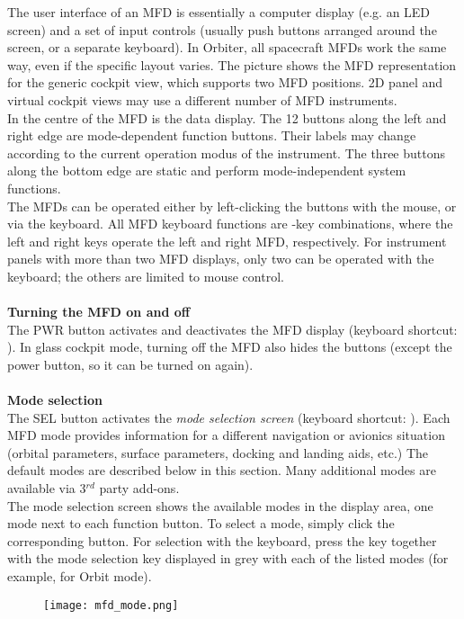 \documentclass[Orbiter User Manual.tex]{subfiles}
\begin{document}
\noindent
The user interface of an MFD is essentially a computer display (e.g. an LED screen) and a set of input controls (usually push buttons arranged around the screen, or a separate keyboard). In Orbiter, all spacecraft MFDs work the same way, even if the specific layout varies. The picture shows the MFD representation for the generic cockpit view, which supports two MFD positions. 2D panel and virtual cockpit views may use a different number of MFD instruments.\\
In the centre of the MFD is the data display. The 12 buttons along the left and right edge are mode-dependent function buttons. Their labels may change according to the current operation modus of the instrument. The three buttons along the bottom edge are static and perform mode-independent system functions.\\
The MFDs can be operated either by left-clicking the buttons with the mouse, or via the keyboard. All MFD keyboard functions are \Shift-key combinations, where the left and right \Shift keys operate the left and right MFD, respectively. For instrument panels with more than two MFD displays, only two can be operated with the keyboard; the others are limited to mouse control.\\
\\
\textbf{Turning the MFD on and off}\\
The PWR button activates and deactivates the MFD display (keyboard shortcut: \Shift{}). In glass cockpit mode, turning off the MFD also hides the buttons (except the power button, so it can be turned on again).\\
\\
\textbf{Mode selection}\\
The SEL button activates the \textit{mode selection screen} (keyboard shortcut: \Ctrl{}). Each MFD mode provides information for a different navigation or avionics situation (orbital parameters, surface parameters, docking and landing aids, etc.) The default modes are described below in this section. Many additional modes are available via 3$^{rd}$ party add-ons.\\
The mode selection screen shows the available modes in the display area, one mode next to each function button. To select a mode, simply click the corresponding button. For selection with the keyboard, press the \Ctrl key together with the mode selection key displayed in grey with each of the listed modes (for example, \Ctrl{} for Orbit mode).

\begin{figure}[H]
  \centering
  \texttt{[image: mfd\_mode.png]}
\end{figure}
\end{document}
